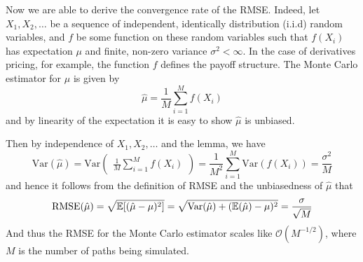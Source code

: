\documentclass[]{article}
\theoremstyle{remark}
\theoremstyle{plain}
\begin{document}
Now we are able to derive the convergence rate of the RMSE. Indeed, let $X_1,X_2,\ldots$ be a sequence of independent, identically distribution (i.i.d) random variables, and $f$ be some function on these random variables such that $f(X_i)$ has expectation $\mu$ and finite, non-zero variance $\sigma^2 < \infty$. In the case of derivatives pricing, for example, the function $f$ defines the payoff structure. The Monte Carlo estimator for $\mu$ is given by
\begin{equation*}
	\hat{\mu} = \frac{1}{M}\sum_{i=1}^{M}f(X_i)
\end{equation*}
and by linearity of the expectation it is easy to show $\hat{\mu}$ is unbiased.

\medskip

\noindent Then by independence of $X_1,X_2,\ldots$ and the lemma, we have
\begin{equation*}
	\text{Var} (\hat{\mu}) = \text{Var} \begin{pmatrix} \displaystyle \frac{1}{M}\sum_{i=1}^M f(X_i) \end{pmatrix} = \frac{1}{M^2} \sum_{i=1}^M \text{Var} (f(X_i)) = \frac{\sigma^2}{M}
\end{equation*}
and hence it follows from the definition of RMSE and the unbiasedness of $\hat{\mu}$ that
\begin{equation*}
	\textup{RMSE}(\hat{\mu}) = \sqrt{\mathbb{E}[(\hat{\mu}-\mu)^2]} = \sqrt{\text{Var}(\hat{\mu})+(\mathbb{E}(\hat{\mu})-\mu)^2} = \frac{\sigma}{\sqrt{M}}
\end{equation*}
\noindent And thus the RMSE for the Monte Carlo estimator scales like $\mathcal{O}(M^{-1/2})$, where $M$ is the number of paths being simulated.
\end{document}
